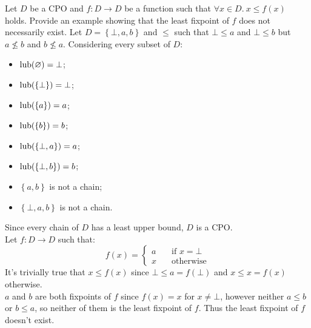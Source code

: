 \begin{exercise}{
    Let $D$ be a CPO and $f: D \to D$ be a function such that $\forall x \in D.\ x \leq f(x)$ holds. Provide an example showing that the least fixpoint of $f$ does not necessarily exist.
}
    Let $D = \left\{\bot, a, b\right\}$ and $\leq$ such that $\bot \le a$ and $\bot \le b$ but $a \not\leq b$ and $b \not\leq a$. Considering every subset of $D$:
    \begin{itemize}
        \item $\operatorname{lub}(\varnothing) = \bot$;
        \item $\operatorname{lub}(\left\{\bot\right\}) = \bot$;
        \item $\operatorname{lub}(\left\{a\right\}) = a$;
        \item $\operatorname{lub}(\left\{b\right\}) = b$;
        \item $\operatorname{lub}(\left\{\bot, a\right\}) = a$;
        \item $\operatorname{lub}(\left\{\bot, b\right\}) = b$;
        \item $\left\{a, b\right\}$ is not a chain;
        \item $\left\{\bot, a, b\right\}$ is not a chain.
    \end{itemize}
    Since every chain of $D$ has a least upper bound, $D$ is a CPO. \\
    Let $f : D \to D$ such that:
    \[
        f(x) = \begin{cases}
            a &\quad \text{if } x = \bot \\
            x &\quad \text{otherwise}
        \end{cases}
    \]
    It's trivially true that $x \leq f(x)$ since $\bot \leq a = f(\bot)$ and $x \leq x = f(x)$ otherwise. \\
    $a$ and $b$ are both fixpoints of $f$ since $f(x) = x$ for $x \neq \bot$, however neither $a \leq b$ or $b \leq a$, so neither of them is the least fixpoint of $f$. Thus the least fixpoint of $f$ doesn't exist.
\end{exercise}
